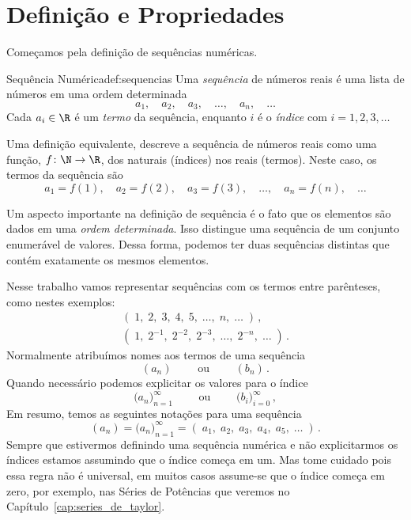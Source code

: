 \section{Definição e Propriedades}

Começamos pela definição de sequências numéricas.

\begin{definicao}{Sequência Numérica}{def:sequencias}
  Uma \emph{sequência}%
  de números reais é uma lista de números em uma ordem determinada
  \[ a_1,\quad a_2,\quad a_3,\quad \dots,\quad a_n,\quad \dots \]
  Cada $a_i\in\R$ é um \emph{termo} da sequência,
  enquanto $i$ é o \emph{índice} com $i=1, 2, 3, \dots$
\end{definicao}

Uma definição equivalente, descreve a sequência de números reais
como uma função, $f\colon\N\to\R$, dos naturais (índices) nos reais (termos).
Neste caso, os termos da sequência são
\[
  a_1=f(1),\quad a_2=f(2),\quad a_3=f(3),\quad \dots,\quad a_n=f(n),\quad \dots
\]

Um aspecto importante na definição de sequência é o fato que os elementos são
dados em uma \emph{ordem determinada}.
Isso distingue uma sequência de um conjunto enumerável de valores.
Dessa forma, podemos ter duas sequências distintas que contém exatamente
os mesmos elementos.

Nesse trabalho vamos representar sequências com os termos entre parênteses,
como nestes exemplos:
\begin{gather*}
  (\; 1, \; 2,      \; 3,      \; 4,      \; 5,     \; \dots,  \; n, \; \dots\; )  \,, \\
  (\; 1, \; 2^{-1}, \; 2^{-2}, \; 2^{-3}, \; \dots, \; 2^{-n}, \;       \dots\; )  \,.
\end{gather*}
Normalmente atribuímos nomes aos termos de uma sequência
\[
  (a_n) \qquad \text{ ou } \qquad (b_n)     \,.
\]
Quando necessário podemos explicitar os valores para o índice
\[
  \big(a_n\big)_{n=1}^\infty \qquad \text{ ou } \qquad
  \big(b_i\big)_{i=0}^\infty \,,
\]
Em resumo, temos as seguintes notações para uma sequência
\[
  (a_n)
  = \big(a_n\big)_{n=1}^\infty
  = (\; a_1, \; a_2, \; a_3, \; a_4, \; a_5, \; \dots\;)     \,.
\]
Sempre que estivermos definindo uma sequência numérica e não explicitarmos
os índices estamos assumindo que o índice começa em um. Mas tome cuidado
pois essa regra não é universal, em muitos casos assume-se que o índice
começa em zero, por exemplo, nas Séries de Potências que veremos no
Capítulo~\ref{cap:series_de_taylor}.


